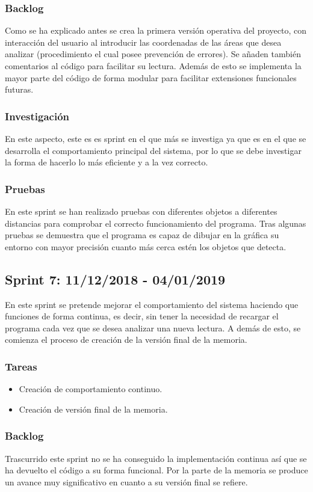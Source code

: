 \subsubsection{Backlog}
Como se ha explicado antes se crea la primera versión operativa del proyecto, con interacción del usuario al introducir las coordenadas de las áreas que desea analizar (procedimiento el cual posee prevención de errores). Se añaden también comentarios al código para facilitar su lectura. Además de esto se implementa la mayor parte del código de forma modular para facilitar extensiones funcionales futuras.
\subsubsection{Investigación}
En este aspecto, este es es sprint en el que más se investiga ya que es en el que se desarrolla el comportamiento principal del sistema, por lo que se debe investigar la forma de hacerlo lo más eficiente y a la vez correcto.
\subsubsection{Pruebas}
En este sprint se han realizado pruebas con diferentes objetos a diferentes distancias para comprobar el correcto funcionamiento del programa. Tras algunas pruebas se demuestra que el programa es capaz de dibujar en la gráfica su entorno con mayor precisión cuanto más cerca estén los objetos que detecta.

\subsection{Sprint 7: 11/12/2018 - 04/01/2019}
En este sprint se pretende mejorar el comportamiento del sistema haciendo que funciones de forma continua, es decir, sin tener la necesidad de recargar el programa cada vez que se desea analizar una nueva lectura. A demás de esto, se comienza el proceso de creación de la versión final de la memoria.
\subsubsection{Tareas}
\begin{itemize}
	\item Creación de comportamiento continuo.
	\item Creación de versión final de la memoria.
\end{itemize}
\subsubsection{Backlog}
Trascurrido este sprint no se ha conseguido la implementación continua así que se ha devuelto el código a su forma funcional. Por la parte de la memoria se produce un avance muy significativo en cuanto a su versión final se refiere.
